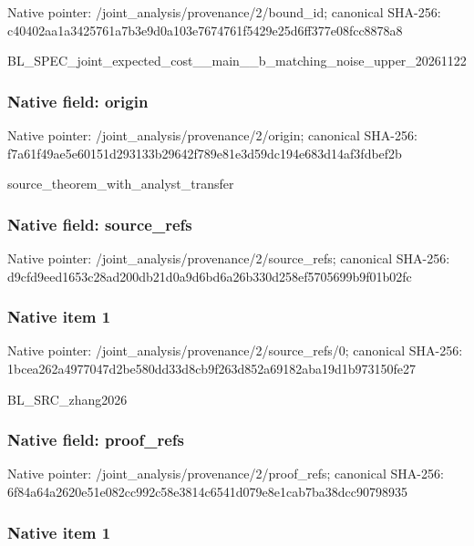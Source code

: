 \documentclass[10pt,a4paper]{article}
\begin{document}
Native pointer: /joint\_analysis/provenance/2/bound\_id; canonical SHA-256: c40402aa1a3425761a7b3e9d\allowbreak{}0a103e7674761f5429e25d6f\allowbreak{}f377e08fcc8878a8


BL\_SPEC\_joint\_expected\_c\allowbreak{}ost\_\_main\_\_b\_matching\_no\allowbreak{}ise\_upper\_20261122


\subsubsection{Native field: origin}


Native pointer: /joint\_analysis/provenance/2/origin; canonical SHA-256: f7a61f49ae5e60151d293133\allowbreak{}b29642f789e81e3d59dc194e\allowbreak{}683d14af3fdbef2b


source\_theorem\_with\_analyst\_transfer


\subsubsection{Native field: source\_refs}


Native pointer: /joint\_analysis/provenan\allowbreak{}ce/2/source\_refs; canonical SHA-256: d9cfd9eed1653c28ad200db2\allowbreak{}1d0a9d6bd6a26b330d258ef5\allowbreak{}705699b9f01b02fc



\subsubsection{Native item 1}


Native pointer: /joint\_analysis/provenan\allowbreak{}ce/2/source\_refs/0; canonical SHA-256: 1bcea262a4977047d2be580d\allowbreak{}d33d8cb9f263d852a69182ab\allowbreak{}a19d1b973150fe27


BL\_SRC\_zhang2026


\subsubsection{Native field: proof\_refs}


Native pointer: /joint\_analysis/provenance/2/proof\_refs; canonical SHA-256: 6f84a64a2620e51e082cc992\allowbreak{}c58e3814c6541d079e8e1cab\allowbreak{}7ba38dcc90798935



\subsubsection{Native item 1}
\end{document}
